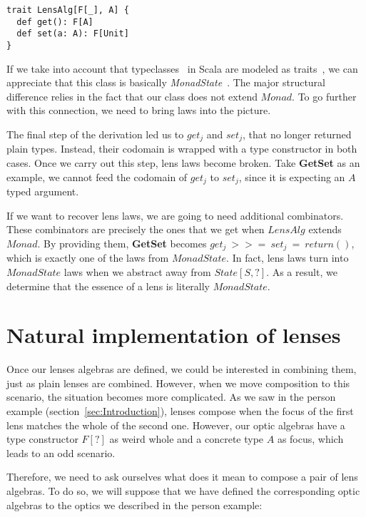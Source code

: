 \documentclass[final, twocolumn, 3p]{elsarticle}
\begin{document}
\begin{lstlisting}
trait LensAlg[F[_], A] {
  def get(): F[A]
  def set(a: A): F[Unit]
}
\end{lstlisting}

If we take into account that typeclasses~\cite{wadler1989make} in Scala are
modeled as traits~\cite{oliveira2010type}, we can appreciate that this class is
basically \emph{MonadState}~\cite{gibbons2012unifying}. The major structural
difference relies in the fact that our class does not extend $Monad$. To go
further with this connection, we need to bring laws into the picture.

The final step of the derivation led us to $get_j$ and $set_j$, that no longer
returned plain types. Instead, their codomain is wrapped with a type constructor
in both cases. Once we carry out this step, lens laws become broken. Take
\textbf{GetSet} as an example, we cannot feed the codomain of $get_j$ to
$set_j$, since it is expecting an $A$ typed argument.

If we want to recover lens laws, we are going to need additional combinators.
These combinators are precisely the ones that we get when $LensAlg$ extends
$Monad$. By providing them, \textbf{GetSet} becomes $get_j\ >>=\ set_j\ =\
return()$, which is exactly one of the laws from $MonadState$. In fact, lens
laws turn into $MonadState$ laws when we abstract away from $State[S, ?]$. As a
result, we determine that the essence of a lens is literally $MonadState$.

\section{Natural implementation of lenses}
\label{sec:Natural}

Once our lenses algebras are defined, we could be interested in combining them,
just as plain lenses are combined. However, when we move composition to this
scenario, the situation becomes more complicated. As we saw in the person
example (section~\ref{sec:Introduction}), lenses compose when the focus of the
first lens matches the whole of the second one. However, our optic algebras have
a type constructor $F[?]$ as weird whole and a concrete type $A$ as focus, which
leads to an odd scenario.

Therefore, we need to ask ourselves what does it mean to compose a pair of lens
algebras. To do so, we will suppose that we have defined the corresponding optic
algebras to the optics we described in the person example:
\end{document}
